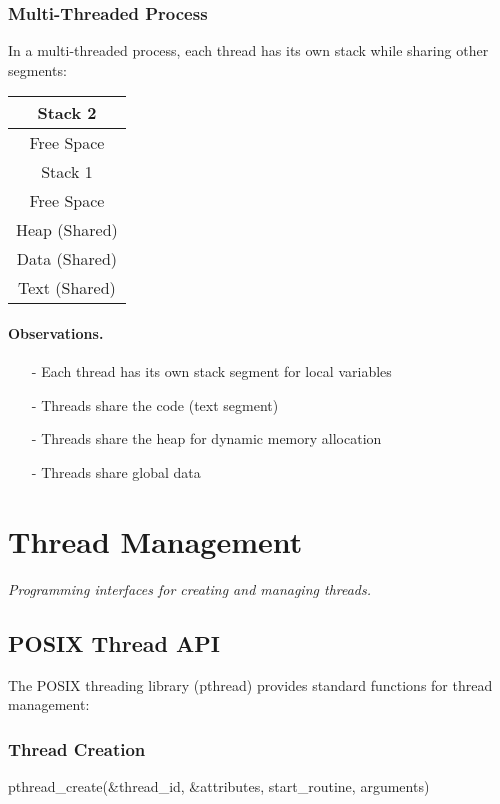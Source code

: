 \documentclass[../../compsys.tex]{subfiles}
\begin{document}
\subsubsection{Multi-Threaded Process}
In a multi-threaded process, each thread has its own stack while sharing other segments:
\begin{center}
\begin{tabular}{|c|}
\hline
Stack 2 \\
\hline
Free Space \\
\hline
Stack 1 \\
\hline
Free Space \\
\hline
Heap (Shared) \\
\hline
Data (Shared) \\
\hline
Text (Shared) \\
\hline
\end{tabular}
\end{center}

\paragraph{Observations.}
\begin{itemize}
  \item[-] Each thread has its own stack segment for local variables
  \item[-] Threads share the code (text segment)
  \item[-] Threads share the heap for dynamic memory allocation
  \item[-] Threads share global data
\end{itemize}
\newpage
\section{Thread Management}
\textit{Programming interfaces for creating and managing threads.}

\subsection{POSIX Thread API}
The POSIX threading library (pthread) provides standard functions for thread management:

\subsubsection{Thread Creation}
\begin{cc}
pthread_create(&thread_id, &attributes, start_routine, arguments)
\end{cc}
\end{document}
